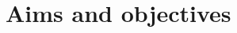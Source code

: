\documentclass[a4paper,10pt]{article}
\begin{document}
 




\section{Aims and objectives}
\end{document}
